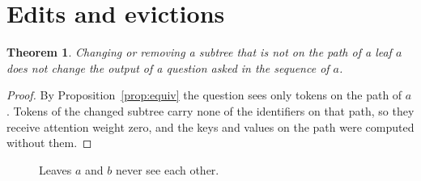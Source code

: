 \documentclass{article}
\newtheorem{thm}{Theorem}
\begin{document}
\section{Edits and evictions}
\begin{thm}
Changing or removing a subtree that is not on the path of a leaf $a$ does not change the output of a question asked in the sequence of $a$.
\end{thm}
\begin{proof}
By Proposition~\ref{prop:equiv} the question sees only tokens on the path of $a$.
Tokens of the changed subtree carry none of the identifiers on that path, so they receive attention weight zero, and the keys and values on the path were computed without them.
\end{proof}

\begin{figure}[h]
\centering
{}
\caption{Leaves $a$ and $b$ never see each other.}
\end{figure}
\end{document}
